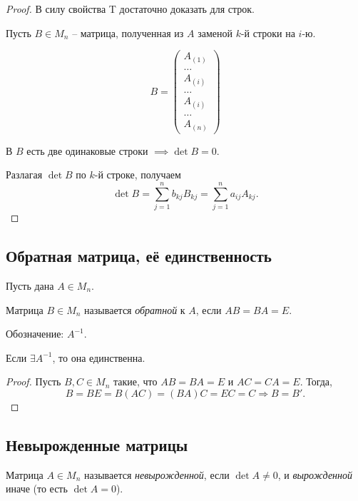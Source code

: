 \begin{proof}
    В силу свойства T достаточно доказать для строк.

    Пусть $B \in M_n$ -- матрица, полученная из $A$ заменой $k$-й строки на $i$-ю.

    \begin{equation*}
        B = \begin{pmatrix}
            A_{(1)} \\ \dots \\ A_{(i)} \\ \dots \\ A_{(i)} \\ \dots \\ A_{(n)}
        \end{pmatrix}
    \end{equation*}

    В $B$ есть две одинаковые строки $\implies \det B = 0$.

    Разлагая $\det B$ по $k$-й строке, получаем
    \begin{equation*}
        \det B = \sum_{j = 1}^n b_{kj} B_{kj} = \sum_{j = 1}^n a_{ij} A_{kj}
    .\end{equation*}
\end{proof}


\subsection{Обратная матрица, её единственность}

Пусть дана $A \in M_n$.

\begin{definition}
    Матрица $B \in M_n$ называется \textit{обратной} к $A$, если $AB = BA = E$.

    Обозначение: $A^{-1}$.
\end{definition}


\begin{lemma}
    Если $\exists A^{-1}$, то она единственна.
\end{lemma}

\begin{proof}
    Пусть $B, C \in M_n$ такие, что $AB = BA = E$ и $AC = CA = E$. Тогда,
    \begin{equation*}
        B = BE = B(AC) = (BA)C = EC = C \Rightarrow B = B'
    .\end{equation*}
\end{proof}


\subsection{Невырожденные матрицы}
\begin{definition}
    Матрица $A \in M_n$ называется \textit{невырожденной}, если $\det A \neq 0$, и \textit{вырожденной} иначе (то есть $\det A = 0$).
\end{definition}


